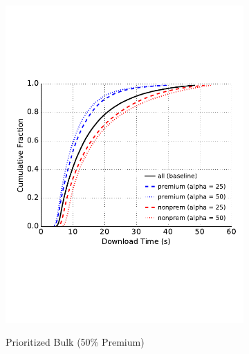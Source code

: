 \begin{figure}
\begin{subfigure}[t]{0.32\textwidth}
\includegraphics[trim={0 3cm 0 3cm}, clip, width=1.0\textwidth]{images/modifier_pr25_web.pdf}
		\label{fig:stats_b}
		\caption{Prioritized Bulk (50\% Premium)}
	\end{subfigure}
	\begin{subfigure}[t]{0.32\textwidth} \centering

\end{subfigure}
\end{figure}
